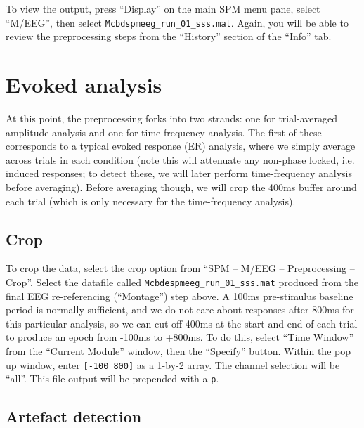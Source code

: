 To view the output, press ``Display'' on the main SPM menu pane, select ``M/EEG'', then select \texttt{Mcbdspmeeg\_run\_01\_sss.mat}. Again, you will be able to review the preprocessing steps from the ``History'' section of the ``Info'' tab. 

\section{Evoked analysis}

At this point, the preprocessing forks into two strands: one for trial-averaged amplitude analysis and one for time-frequency analysis. The first of these corresponds to a typical evoked response (ER) analysis, where we simply average across trials in each condition (note this will attenuate any non-phase locked, i.e. induced responses; to detect these, we will later perform time-frequency analysis before averaging). Before averaging though, we will crop the 400ms buffer around each trial (which is only necessary for the time-frequency analysis).

\subsection{Crop}

To crop the data, select the crop option from ``SPM -- M/EEG -- Preprocessing -- Crop''. Select the datafile called \texttt{Mcbdespmeeg\_run\_01\_sss.mat} produced from the final EEG re-referencing (``Montage'') step above.  A 100ms pre-stimulus baseline period is normally sufficient, and we do not care about responses after 800ms for this particular analysis, so we can cut off 400ms at the start and end of each trial to produce an epoch from -100ms to +800ms. To do this, select ``Time Window'' from the ``Current Module'' window, then the ``Specify'' button. Within the pop up window, enter \texttt{[-100 800]} as a 1-by-2 array. The channel selection will be ``all''. This file output will be prepended with a \texttt{p}.

\subsection{Artefact detection}

